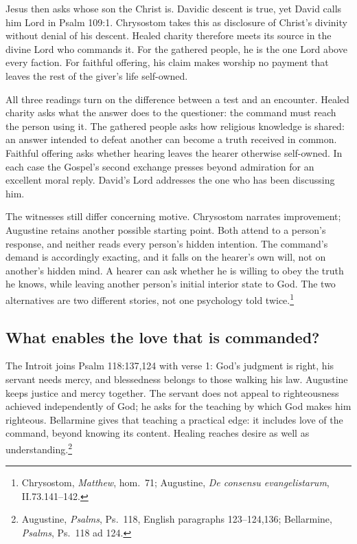 Jesus then asks whose son the Christ is. Davidic descent is true, yet David calls him Lord in Psalm 109:1. Chrysostom takes this as disclosure of Christ's divinity without denial of his descent. Healed charity therefore meets its source in the divine Lord who commands it. For the gathered people, he is the one Lord above every faction. For faithful offering, his claim makes worship no payment that leaves the rest of the giver's life self-owned.

All three readings turn on the difference between a test and an encounter. Healed charity asks what the answer does to the questioner: the command must reach the person using it. The gathered people asks how religious knowledge is shared: an answer intended to defeat another can become a truth received in common. Faithful offering asks whether hearing leaves the hearer otherwise self-owned. In each case the Gospel's second exchange presses beyond admiration for an excellent moral reply. David's Lord addresses the one who has been discussing him.

The witnesses still differ concerning motive. Chrysostom narrates improvement; Augustine retains another possible starting point. Both attend to a person's response, and neither reads every person's hidden intention. The command's demand is accordingly exacting, and it falls on the hearer's own will, not on another's hidden mind. A hearer can ask whether he is willing to obey the truth he knows, while leaving another person's initial interior state to God. The two alternatives are two different stories, not one psychology told twice.\footnote{Chrysostom, \textit{Matthew}, hom.~71; Augustine, \textit{De consensu evangelistarum}, II.73.141--142.}

\subsection{What enables the love that is commanded?}

The Introit joins Psalm 118:137,124 with verse 1: God's judgment is right, his servant needs mercy, and blessedness belongs to those walking his law. Augustine keeps justice and mercy together. The servant does not appeal to righteousness achieved independently of God; he asks for the teaching by which God makes him righteous. Bellarmine gives that teaching a practical edge: it includes love of the command, beyond knowing its content. Healing reaches desire as well as understanding.\footnote{Augustine, \textit{Psalms}, Ps.~118, English paragraphs 123--124,136; Bellarmine, \textit{Psalms}, Ps.~118 ad 124.}

